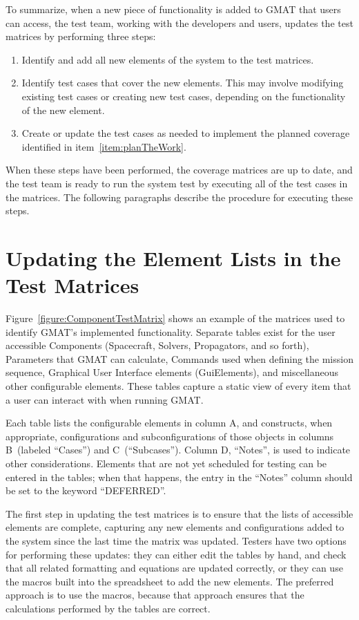 To summarize, when a new piece of functionality is added to GMAT that users can access, the test
team, working with the developers and users, updates the test matrices by performing three steps:

\begin{enumerate}
\item Identify and add all new elements of the system to the test matrices.
\item\label{item:planTheWork} Identify test cases that cover the new elements.  This may involve
modifying existing test cases or creating new test cases, depending on the functionality of the new
element.
\item Create or update the test cases as needed to implement the planned coverage identified in
item~\ref{item:planTheWork}.
\end{enumerate}

When these steps have been performed, the coverage matrices are up to date, and the test team is
ready to run the system test by executing all of the test cases in the matrices.  The following
paragraphs describe the procedure for executing these steps.


\section{Updating the Element Lists in the Test Matrices}

Figure~\ref{figure:ComponentTestMatrix} shows an example of the matrices used to identify GMAT's
implemented functionality.  Separate tables exist for the user accessible Components (Spacecraft,
Solvers, Propagators, and so forth), Parameters that GMAT can calculate, Commands used when defining
the mission sequence, Graphical User Interface elements (GuiElements), and miscellaneous other
configurable elements.  These tables capture a static view of every item that a user can interact
with when running GMAT.

Each table lists the configurable elements in column A, and constructs, when appropriate,
configurations and subconfigurations of those objects in columns B~(labeled ``Cases'') and
C~(``Subcases'').  Column D, ``Notes'', is used to indicate other considerations.  Elements that are
not yet scheduled for testing can be entered in the tables; when that happens, the entry in the
``Notes'' column should be set to the keyword ``DEFERRED''.

The first step in updating the test matrices is to ensure that the lists of accessible elements are
complete, capturing any new elements and configurations added to the system since the last time the
matrix was updated.  Testers have two options for performing these updates: they can either edit the
tables by hand, and check that all related formatting and equations are updated correctly, or they
can use the macros built into the spreadsheet to add the new elements.  The preferred approach is to
use the macros, because that approach ensures that the calculations performed by the tables are
correct.

